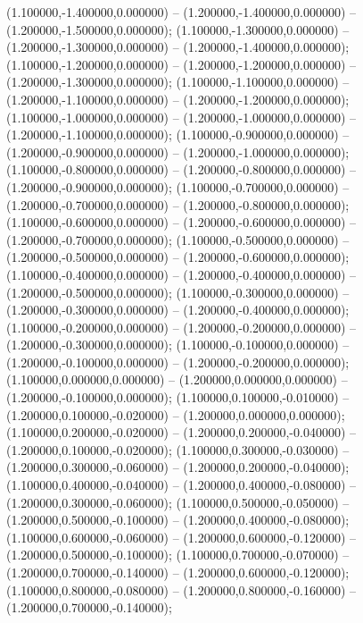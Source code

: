  (1.100000,-1.400000,0.000000) -- (1.200000,-1.400000,0.000000) -- (1.200000,-1.500000,0.000000);
 (1.100000,-1.300000,0.000000) -- (1.200000,-1.300000,0.000000) -- (1.200000,-1.400000,0.000000);
 (1.100000,-1.200000,0.000000) -- (1.200000,-1.200000,0.000000) -- (1.200000,-1.300000,0.000000);
 (1.100000,-1.100000,0.000000) -- (1.200000,-1.100000,0.000000) -- (1.200000,-1.200000,0.000000);
 (1.100000,-1.000000,0.000000) -- (1.200000,-1.000000,0.000000) -- (1.200000,-1.100000,0.000000);
 (1.100000,-0.900000,0.000000) -- (1.200000,-0.900000,0.000000) -- (1.200000,-1.000000,0.000000);
 (1.100000,-0.800000,0.000000) -- (1.200000,-0.800000,0.000000) -- (1.200000,-0.900000,0.000000);
 (1.100000,-0.700000,0.000000) -- (1.200000,-0.700000,0.000000) -- (1.200000,-0.800000,0.000000);
 (1.100000,-0.600000,0.000000) -- (1.200000,-0.600000,0.000000) -- (1.200000,-0.700000,0.000000);
 (1.100000,-0.500000,0.000000) -- (1.200000,-0.500000,0.000000) -- (1.200000,-0.600000,0.000000);
 (1.100000,-0.400000,0.000000) -- (1.200000,-0.400000,0.000000) -- (1.200000,-0.500000,0.000000);
 (1.100000,-0.300000,0.000000) -- (1.200000,-0.300000,0.000000) -- (1.200000,-0.400000,0.000000);
 (1.100000,-0.200000,0.000000) -- (1.200000,-0.200000,0.000000) -- (1.200000,-0.300000,0.000000);
 (1.100000,-0.100000,0.000000) -- (1.200000,-0.100000,0.000000) -- (1.200000,-0.200000,0.000000);
 (1.100000,0.000000,0.000000) -- (1.200000,0.000000,0.000000) -- (1.200000,-0.100000,0.000000);
 (1.100000,0.100000,-0.010000) -- (1.200000,0.100000,-0.020000) -- (1.200000,0.000000,0.000000);
 (1.100000,0.200000,-0.020000) -- (1.200000,0.200000,-0.040000) -- (1.200000,0.100000,-0.020000);
 (1.100000,0.300000,-0.030000) -- (1.200000,0.300000,-0.060000) -- (1.200000,0.200000,-0.040000);
 (1.100000,0.400000,-0.040000) -- (1.200000,0.400000,-0.080000) -- (1.200000,0.300000,-0.060000);
 (1.100000,0.500000,-0.050000) -- (1.200000,0.500000,-0.100000) -- (1.200000,0.400000,-0.080000);
 (1.100000,0.600000,-0.060000) -- (1.200000,0.600000,-0.120000) -- (1.200000,0.500000,-0.100000);
 (1.100000,0.700000,-0.070000) -- (1.200000,0.700000,-0.140000) -- (1.200000,0.600000,-0.120000);
 (1.100000,0.800000,-0.080000) -- (1.200000,0.800000,-0.160000) -- (1.200000,0.700000,-0.140000);
